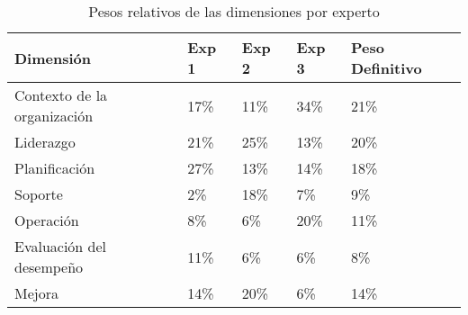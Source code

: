 
\begin{table}[H]
    \centering
    \begin{tabular}{p{5cm}|p{1.25cm}|p{1.25cm}|p{1.25cm}|p{3.25cm}}
        \textbf{Dimensión} & \textbf{Exp 1} & \textbf{Exp 2} & \textbf{Exp 3} & \textbf{Peso Definitivo} \\
        \hline\hline
        Contexto de la organización & 17\% & 11\% & 34\% & 21\%\\
        \hline
        Liderazgo & 21\% & 25\% & 13\% & 20\%\\
        \hline
        Planificación & 27\% & 13\% & 14\% & 18\%\\
        \hline
        Soporte & 2\% & 18\% & 7\% & 9\%\\
        \hline
        Operación & 8\% & 6\% & 20\% & 11\%\\
        \hline
        Evaluación del desempeño & 11\% & 6\% & 6\% & 8\%\\
        \hline
        Mejora & 14\% & 20\% & 6\% & 14\%\\
        \hline
    \end{tabular}
    \caption{Pesos relativos de las dimensiones por experto}
    \label{tab:pesos-expertos}
\end{table}